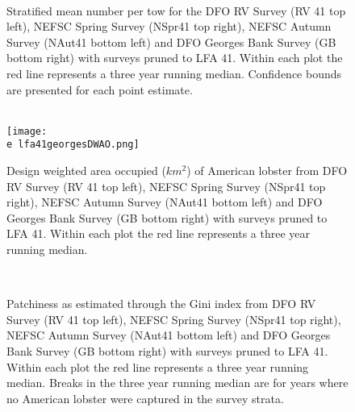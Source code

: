 \documentclass[11pt]{article}
\newcommand{\e}{/SpinDr/backup/bio_data/bio.lobster/figures/} %
\begin{document}
\begin{figure}
\centering
{}\\

\caption{Stratified mean number per tow for the DFO RV Survey (RV 41 top left), NEFSC Spring Survey (NSpr41 top right), NEFSC Autumn Survey (NAut41 bottom left) and DFO Georges Bank Survey (GB bottom right) with surveys pruned to LFA 41. Within each plot the red line represents a three year running median. Confidence bounds are presented for each point estimate.}
\end{figure}
\clearpage




\begin{figure}
\centering
{}\\
    \texttt{[image: \\e lfa41georgesDWAO.png]}

\caption{Design weighted area occupied ($km^2$) of American lobster from DFO RV Survey (RV 41 top left), NEFSC Spring Survey (NSpr41 top right), NEFSC Autumn Survey (NAut41 bottom left) and DFO Georges Bank Survey (GB bottom right) with surveys pruned to LFA 41. Within each plot the red line represents a three year running median. }
\end{figure}
\clearpage



\begin{figure}
\centering
{}\\

\caption{Patchiness as estimated through the Gini index from DFO RV Survey (RV 41 top left), NEFSC Spring Survey (NSpr41 top right), NEFSC Autumn Survey (NAut41 bottom left) and DFO Georges Bank Survey (GB bottom right) with surveys pruned to LFA 41. Within each plot the red line represents a three year running median. Breaks in the three year running median are for years where no American lobster were captured in the survey strata.}
\end{figure}
\clearpage
\end{document}
